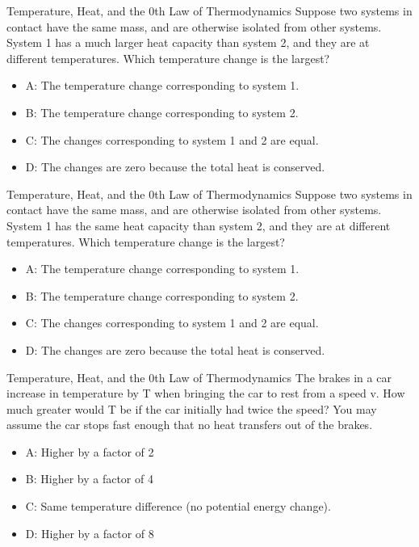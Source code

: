 \documentclass{beamer}
\begin{document}
\begin{frame}{Temperature, Heat, and the 0th Law of Thermodynamics}
\small
Suppose two systems in contact have the same mass, and are otherwise isolated from other systems.  System 1 has a much larger heat capacity than system 2, and they are at different temperatures.  Which temperature change is the largest?
\begin{itemize}
\item A: The temperature change corresponding to system 1.
\item B: The temperature change corresponding to system 2.
\item C: The changes corresponding to system 1 and 2 are equal.
\item D: The changes are zero because the total heat is conserved.
\end{itemize}
\end{frame}

\begin{frame}{Temperature, Heat, and the 0th Law of Thermodynamics}
\small
Suppose two systems in contact have the same mass, and are otherwise isolated from other systems.  System 1 has the same heat capacity than system 2, and they are at different temperatures.  Which temperature change is the largest?
\begin{itemize}
\item A: The temperature change corresponding to system 1.
\item B: The temperature change corresponding to system 2.
\item C: The changes corresponding to system 1 and 2 are equal.
\item D: The changes are zero because the total heat is conserved.
\end{itemize}
\end{frame}

\begin{frame}{Temperature, Heat, and the 0th Law of Thermodynamics}
The brakes in a car increase in temperature by T when bringing the car to rest from a speed v. How much greater would T be if the car initially had twice the speed? You may assume the car stops fast enough that no heat transfers out of the brakes.
\begin{itemize}
\item A: Higher by a factor of 2
\item B: Higher by a factor of 4
\item C: Same temperature difference (no potential energy change).
\item D: Higher by a factor of 8
\end{itemize}
\end{frame}
\end{document}
